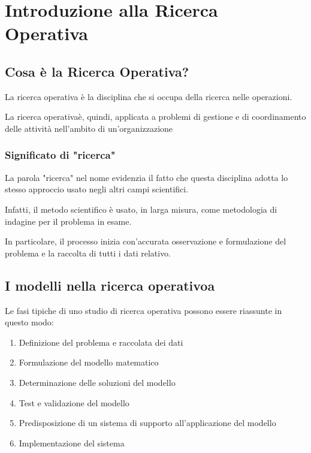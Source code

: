 \chapter{Introduzione alla Ricerca Operativa}
\section{Cosa è la Ricerca Operativa?}
La ricerca operativa è la disciplina che si occupa della ricerca nelle operazioni.

La ricerca operativaè, quindi, applicata a problemi di gestione e di coordinamento delle attività nell'ambito di un'organizzazione

\subsection{Significato di "ricerca"}
La parola "ricerca" nel nome evidenzia il fatto che questa disciplina adotta lo stesso approccio usato negli altri campi scientifici.

Infatti, il metodo scientifico è usato, in larga misura, come metodologia di indagine per il problema in esame.

In particolare, il processo inizia con'accurata osservazione e formulazione del problema e la raccolta di tutti i dati relativo.

\section{I modelli nella ricerca operativoa}
Le fasi tipiche di uno studio di ricerca operativa possono essere riassunte in questo modo:
\begin{enumerate}
    \item Definizione del problema e raccolata dei dati
    \item Formulazione del modello matematico
    \item Determinazione delle soluzioni del modello
    \item Test e validazione del modello
    \item Predisposizione di un sistema di supporto all'applicazione del modello
    \item Implementazione del sistema
\end{enumerate}